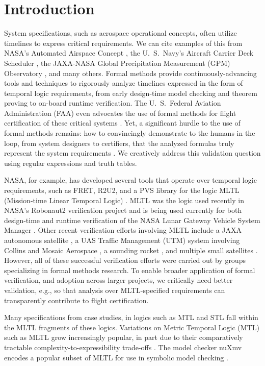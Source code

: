 \documentclass[runningheads]{llncs}
\begin{document}
\section{Introduction}

System specifications, such as aerospace operational concepts, often utilize timelines to express critical requirements. We can cite examples of this from NASA's Automated Airspace Concept \cite{EH10}, the U.~S.~Navy's Aircraft Carrier Deck Scheduler \cite{RCRBS11}, the JAXA-NASA Global Precipitation Measurement (GPM) Observatory \cite{GPM}, and many others. Formal methods provide continuously-advancing tools and techniques to rigorously analyze timelines expressed in the form of temporal logic requirements, from early design-time model checking and theorem proving to on-board runtime verification. The U.~S.~Federal Aviation Administration (FAA) even advocates the use of formal methods for flight certification of these critical systems \cite{DO-178C,DO-254,DO-333}. Yet, a significant hurdle to the use of formal methods remains: how to convincingly demonstrate to the humans in the loop, from system designers to certifiers, that the analyzed formulas truly represent the system requirements \cite{Roz16}. We creatively address this validation question using regular expressions and truth tables.

NASA, for example, has developed several tools that operate over temporal logic requirements, such as FRET\cite{GMRPSS20}, R2U2\cite{RS17}, and a PVS library \cite{CTGPD22} for the logic MLTL (Mission-time Linear Temporal Logic) \cite{RRS14,LVR22}. MLTL was the logic used recently in NASA's Robonaut2 verification project \cite{KZJZR20} and is being used currently for both design-time and runtime verification of the NASA Lunar Gateway Vehicle System Manager \cite{DBR21}. Other recent verification %
efforts involving MLTL include a JAXA autonomous satellite \cite{JAXA}, a UAS Traffic Management (UTM) system involving Collins and Mosaic Aerospace \cite{HCHJR21}, a sounding rocket \cite{HLR21}, and multiple small satellites \cite{LLR21,LJBHCLR22,AJR22}. However, all of these successful verification efforts were carried out by groups specializing in formal methods research. To enable broader application of formal verification, and adoption across larger projects, we critically need better validation, e.g., so that analysis over MLTL-specified requirements can transparently contribute to flight certification. 

Many specifications from case studies, in logics such as MTL \cite{AH90} and STL \cite{MN04} fall within the MLTL fragments of these logics. 
Variations on Metric Temporal Logic (MTL) such as MLTL grow increasingly popular, in part due to their comparatively tractable complexity-to-expressibility trade-offs \cite{OW08}.
The model checker {\sf nuXmv} encodes a popular subset of MLTL for use in symbolic model checking \cite{nuXmv-v1.1.0}.%
\end{document}
